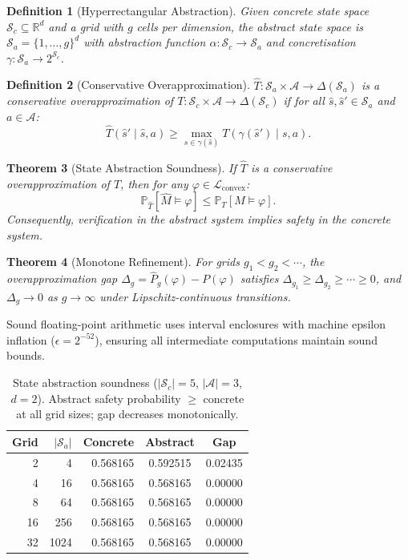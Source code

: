 \documentclass[11pt]{article}
\newtheorem{theorem}{Theorem}
\newtheorem{definition}[theorem]{Definition}
\newcommand{\Prob}{\mathbb{P}}
\newcommand{\R}{\mathbb{R}}
\newcommand{\cA}{\mathcal{A}}
\newcommand{\cS}{\mathcal{S}}
\newcommand{\cL}{\mathcal{L}}
\begin{document}
\begin{definition}[Hyperrectangular Abstraction]\label{def:abstraction}
Given concrete state space $\cS_c \subseteq \R^d$ and a grid with $g$
cells per dimension, the abstract state space is
$\cS_a = \{1, \ldots, g\}^d$ with abstraction function
$\alpha: \cS_c \to \cS_a$ and concretisation
$\gamma: \cS_a \to 2^{\cS_c}$.
\end{definition}

\begin{definition}[Conservative Overapproximation]\label{def:overapprox}
$\hat{T}: \cS_a \times \cA \to \Delta(\cS_a)$ is a conservative
overapproximation of $T: \cS_c \times \cA \to \Delta(\cS_c)$ if for
all $\hat{s}, \hat{s}' \in \cS_a$ and $a \in \cA$:
\begin{equation}\label{eq:overapprox}
  \hat{T}(\hat{s}' \mid \hat{s}, a) \geq
  \max_{s \in \gamma(\hat{s})} T(\gamma(\hat{s}') \mid s, a).
\end{equation}
\end{definition}

\begin{theorem}[State Abstraction Soundness]\label{thm:abstraction}
If $\hat{T}$ is a conservative overapproximation of $T$, then for any
$\varphi \in \cL_{\mathrm{convex}}$:
\begin{equation}
  \Prob_{\hat{T}}[\hat{M} \models \varphi] \leq
  \Prob_{T}[M \models \varphi].
\end{equation}
Consequently, verification in the abstract system implies safety in
the concrete system.
\end{theorem}

\begin{theorem}[Monotone Refinement]\label{thm:monotone}
For grids $g_1 < g_2 < \cdots$, the overapproximation gap
$\Delta_g = \hat{P}_g(\varphi) - P(\varphi)$ satisfies
$\Delta_{g_1} \geq \Delta_{g_2} \geq \cdots \geq 0$, and
$\Delta_g \to 0$ as $g \to \infty$ under Lipschitz-continuous
transitions.
\end{theorem}

Sound floating-point arithmetic uses interval enclosures with machine
epsilon inflation ($\epsilon = 2^{-52}$), ensuring all intermediate
computations maintain sound bounds.

\begin{table}[t]
\centering
\caption{State abstraction soundness ($|\cS_c|{=}5$, $|\cA|{=}3$,
$d{=}2$).  Abstract safety probability $\geq$ concrete at all grid
sizes; gap decreases monotonically.}\label{tab:abstraction}
\small
\begin{tabular}{@{}rrrcc@{}}
\toprule
\textbf{Grid} & $|\cS_a|$ & \textbf{Concrete} & \textbf{Abstract}
  & \textbf{Gap} \\
\midrule
 2 &    4 & 0.568165 & 0.592515 & 0.02435 \\
 4 &   16 & 0.568165 & 0.568165 & 0.00000 \\
 8 &   64 & 0.568165 & 0.568165 & 0.00000 \\
16 &  256 & 0.568165 & 0.568165 & 0.00000 \\
32 & 1024 & 0.568165 & 0.568165 & 0.00000 \\
\bottomrule
\end{tabular}
\end{table}
\end{document}
